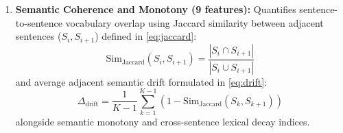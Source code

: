 \documentclass[conference]{IEEEtran}
\begin{document}
\begin{enumerate}
    \begin{equation}
    \label{eq:cv}
        CV_{\text{len}} = \frac{\sigma_{\text{len}}}{\mu_{\text{len}}} = \frac{\sqrt{\frac{1}{K}\sum_{k=1}^K (L_k - \mu_{\text{len}})^2}}{\frac{1}{K}\sum_{k=1}^K L_k}
    \end{equation}
    along with the density of five categorized transition marker families (Addition, Contrast, Causality, Sequence, Conclusion). Punctuation profile entropy is also extracted.
    \item \textbf{Semantic Coherence and Monotony (9 features):} Quantifies sentence-to-sentence vocabulary overlap using Jaccard similarity between adjacent sentences ($S_i, S_{i+1}$) defined in \eqref{eq:jaccard}:
    \begin{equation}
    \label{eq:jaccard}
        \text{Sim}_{\text{Jaccard}}(S_i, S_{i+1}) = \frac{|S_i \cap S_{i+1}|}{|S_i \cup S_{i+1}|}
    \end{equation}
    and average adjacent semantic drift formulated in \eqref{eq:drift}:
    \begin{equation}
    \label{eq:drift}
        \Delta_{\text{drift}} = \frac{1}{K-1} \sum_{k=1}^{K-1} \left( 1 - \text{Sim}_{\text{Jaccard}}(S_k, S_{k+1}) \right)
    \end{equation}
    alongside semantic monotony and cross-sentence lexical decay indices.
\end{enumerate}
\end{document}
